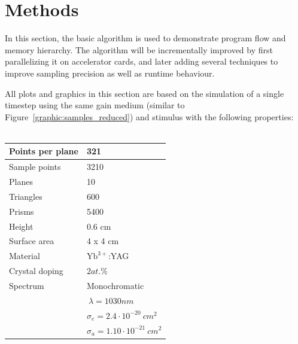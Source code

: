\section{Methods}
In this section, the basic algorithm is used to demonstrate
program flow and memory hierarchy. The algorithm will be incrementally improved
by first parallelizing it on accelerator cards, and later adding several
techniques to improve sampling precision as well as runtime behaviour.

All plots and graphics in this section are based on the simulation of a single
timestep using the same gain medium (similar to
Figure~\ref{graphic:samples_reduced}) and stimulus with the following
properties:
\\
\\
\begin{tabular}{| l | l |}
\hline
Points per plane        & 321\\
\hline
Sample points           & 3210\\
\hline
Planes                  & 10\\
\hline
Triangles               & 600\\
\hline
Prisms                  & 5400\\
\hline
Height                  & 0.6 cm\\
\hline
Surface area            & 4 x 4 cm\\
\hline
Material                & $\text{Yb}^{3+}$:YAG\\
\hline
Crystal doping          & $2at.\%$\\
\hline
Spectrum                & Monochromatic\\
                        & $~\lambda = 1030nm$\\
                        & $\sigma_e = 2.4 \cdot 10^{-20}~cm^2$\\ 
                        & $\sigma_a = 1.10 \cdot 10^{-21}~cm^2$\\
\hline
\end{tabular}

